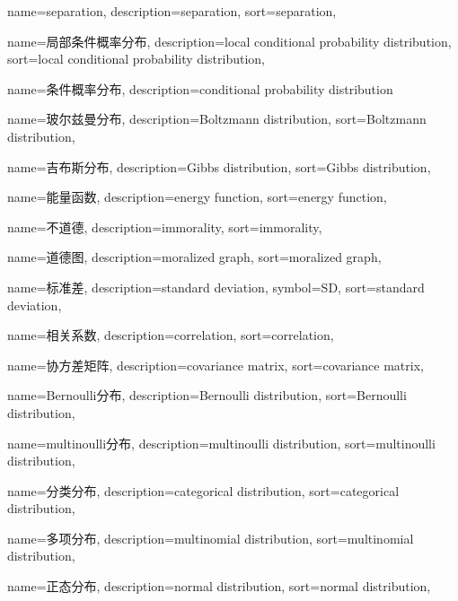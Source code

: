 {
  name=separation,
  description={separation},
  sort={separation},
}

{
  name=局部条件概率分布,
  description={local conditional probability distribution},
  sort={local conditional probability distribution},
}

{
  name=条件概率分布,
  description={conditional probability distribution}
}

{
  name=玻尔兹曼分布,
  description={Boltzmann distribution},
  sort={Boltzmann distribution},
}

{
  name=吉布斯分布,
  description={Gibbs distribution},
  sort={Gibbs distribution},
}

{
  name=能量函数,
  description={energy function},
  sort={energy function},
}

{
  name=不道德,
  description={immorality},
  sort={immorality},
}

{
  name=道德图,
  description={moralized graph},
  sort={moralized graph},
}

{
  name=标准差,
  description={standard deviation},
  symbol={SD},
  sort={standard deviation},
}

{
  name=相关系数,
  description={correlation},
  sort={correlation},
}

{
  name=协方差矩阵,
  description={covariance matrix},
  sort={covariance matrix},
}

{
  name=Bernoulli分布,
  description={Bernoulli distribution},
  sort={Bernoulli distribution},
}

{
  name=multinoulli分布,
  description={multinoulli distribution},
  sort={multinoulli distribution},
}

{
  name=分类分布,
  description={categorical distribution},
  sort={categorical distribution},
}

{
  name=多项分布,
  description={multinomial distribution},
  sort={multinomial distribution},
}

{
  name=正态分布,
  description={normal distribution},
  sort={normal distribution},
}

